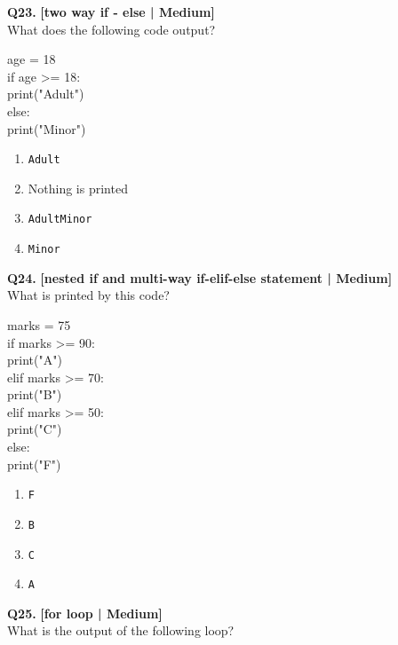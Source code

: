 \noindent\textbf{Q23.} \hfill {\small\color{LPUOrange}\textbf{[two way if - else | Medium]}}\\[2pt]
What does the following code output? 

\begin{pycode}
age = 18\\
if age >= 18:\\
print("Adult")\\
else:\\
print("Minor")
\end{pycode}

\begin{enumerate}[label=(\alph*),topsep=2pt,itemsep=1pt,partopsep=0pt,parsep=0pt]
    \item \relax \texttt{Adult}
    \item \relax Nothing is printed
    \item \relax \texttt{AdultMinor}
    \item \relax \texttt{Minor}
\end{enumerate}
\vspace{2mm}

\noindent\textbf{Q24.} \hfill {\small\color{LPUOrange}\textbf{[nested if and multi-way if-elif-else statement | Medium]}}\\[2pt]
What is printed by this code? 

\begin{pycode}
marks = 75\\
if marks >= 90:\\
print("A")\\
elif marks >= 70:\\
print("B")\\
elif marks >= 50:\\
print("C")\\
else:\\
print("F")
\end{pycode}

\begin{enumerate}[label=(\alph*),topsep=2pt,itemsep=1pt,partopsep=0pt,parsep=0pt]
    \item \relax \texttt{F}
    \item \relax \texttt{B}
    \item \relax \texttt{C}
    \item \relax \texttt{A}
\end{enumerate}
\vspace{2mm}

\noindent\textbf{Q25.} \hfill {\small\color{LPUOrange}\textbf{[for loop | Medium]}}\\[2pt]
What is the output of the following loop? 

